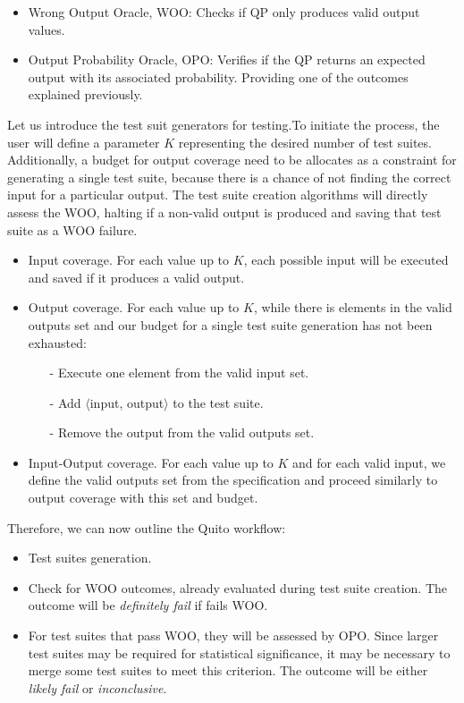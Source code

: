 \begin{itemize}
\vspace{-3pt}
\begin{itemize}
    \item Wrong Output Oracle, WOO: Checks if QP only produces valid output values.
    \item Output Probability Oracle, OPO: Verifies if the QP returns an expected output with its associated probability. Providing one of the outcomes explained previously.
\end{itemize}

Let us introduce the test suit generators for testing.To initiate the process, the user will define a parameter $K$ representing the desired number of test suites. Additionally, a budget for output coverage need to be allocates as a constraint for generating a single test suite, because there is a chance of not finding the correct input for a particular output. The test suite creation algorithms will directly assess the WOO, halting if a non-valid output is produced and saving that test suite as a WOO failure.

\vspace{-3pt}
\begin{itemize}
    \item Input coverage. For each value up to $K$, each possible input will be executed and saved if it produces a valid output.
    \item Output coverage. For each value up to $K$, while there is elements in the valid outputs set and our budget for a single test suite generation has not been exhausted:
    \begin{itemize}
        \item[-] Execute one element from the valid input set.
        \item[-] Add $\langle$input, output$\rangle$ to the test suite.
        \item[-] Remove the output from the valid outputs set.
    \end{itemize}
    \item Input-Output coverage. For each value up to $K$ and for each valid input, we define the valid outputs set from the specification and proceed similarly to output coverage with this set and budget.
\end{itemize}

Therefore, we can now outline the Quito workflow:
\begin{itemize}
    \item Test suites generation.
    \item Check for WOO outcomes, already evaluated during test suite creation. The outcome will be \textit{definitely fail} if fails WOO.
    \item For test suites that pass WOO, they will be assessed by OPO. Since larger test suites may be required for statistical significance, it may be necessary to merge some test suites to meet this criterion. The outcome will be either \textit{likely fail} or \textit{inconclusive}.
\end{itemize}


\end{itemize}
